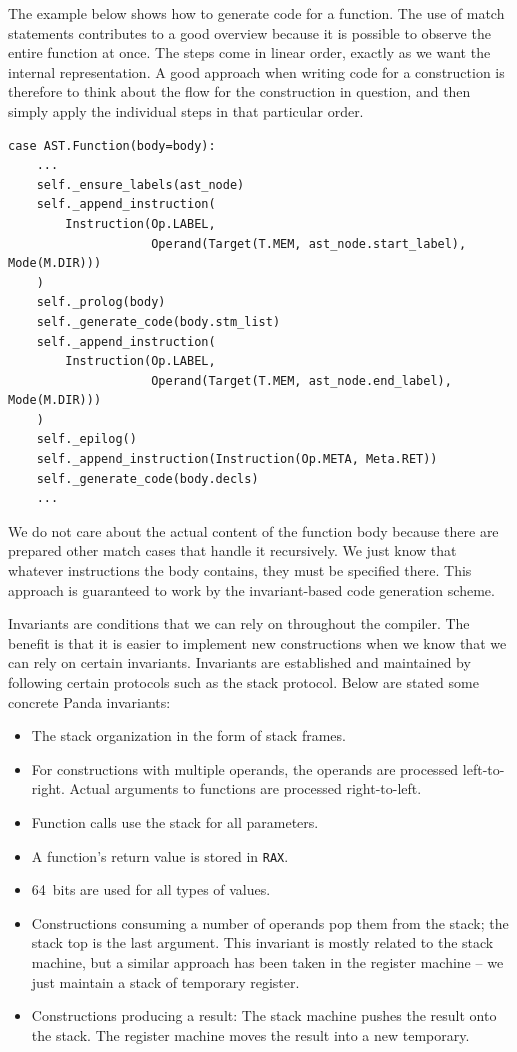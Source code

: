 The example below shows how to generate code for a function. The use of match statements contributes to a good overview because it is possible to observe the entire function at once. The steps come in linear order, exactly as we want the internal representation. A good approach when writing code for a construction is therefore to think about the flow for the construction in question, and then simply apply the individual steps in that particular order.

\begin{verbatim}
case AST.Function(body=body):
    ...
    self._ensure_labels(ast_node)
    self._append_instruction(
        Instruction(Op.LABEL,
                    Operand(Target(T.MEM, ast_node.start_label), Mode(M.DIR)))
    )
    self._prolog(body)
    self._generate_code(body.stm_list)
    self._append_instruction(
        Instruction(Op.LABEL,
                    Operand(Target(T.MEM, ast_node.end_label), Mode(M.DIR)))
    )
    self._epilog()
    self._append_instruction(Instruction(Op.META, Meta.RET))
    self._generate_code(body.decls)
    ...
\end{verbatim}

We do not care about the actual content of the function body because there are prepared other match cases that handle it recursively. We just know that whatever instructions the body contains, they must be specified there. This approach is guaranteed to work by the invariant-based code generation scheme.

Invariants are conditions that we can rely on throughout the compiler. The benefit is that it is easier to implement new constructions when we know that we can rely on certain invariants. Invariants are established and maintained by following certain protocols such as the stack protocol. Below are stated some concrete Panda invariants:

\begin{itemize}
    \item The stack organization in the form of stack frames.
    \item For constructions with multiple operands, the operands are processed left-to-right. Actual arguments to functions are processed right-to-left.
    \item Function calls use the stack for all parameters.
    \item A function's return value is stored in \texttt{RAX}.
    \item \SI{64}{bits} are used for all types of values.
    \item Constructions consuming a number of operands pop them from the stack; the stack top is the last argument. This invariant is mostly related to the stack machine, but a similar approach has been taken in the register machine -- we just maintain a stack of temporary register.
    \item Constructions producing a result: The stack machine pushes the result onto the stack. The register machine moves the result into a new temporary. 
\end{itemize}


